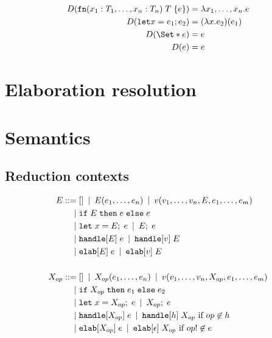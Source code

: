 \begin{align*}
    D(\fn(x_1: T_1, \dots, x_n: T_n)\;T\;\{e\}) &= \lambda x_1,\dots,x_n . e \\
    D(\kw{let} x = e_1; e_2) &= (\lambda x . e_2)(e_1)\\
    D(\S{e}) &= e\\
    D(e) &= e
\end{align*}

\section{Elaboration resolution}

\section{Semantics}
\subsection{Reduction contexts}

\begin{align*}
    E
        \IS & [] \OR E(e_1,\dots, e_n) \OR v(v_1,\dots,v_n,E,e_1,\dots,e_m) \\
        \OR & \cond{E}{e}{e} \\
        \OR & \kw{let}\;x = E;\;e \OR E;\;e\\
        \OR & \kw{handle}[E]\;e \OR \kw{handle}[v]\;E \\
        \OR & \kw{elab}[E]\;e \OR \kw{elab}[v]\;E\\
    \\
    X_{op}
        \IS & [] \OR X_{op}(e_1, \dots, e_n) \OR v(v_1, \dots, v_n, X_{op}, e_1, \dots, e_m) \\
        \OR & \cond{X_{op}}{e_1}{e_2} \\
        \OR & \kw{let}\;x = X_{op};\;e \OR X_{op};\;e \\
        \OR & \kw{handle}[X_{op}]\;e \OR \kw{handle}[h]\;{X_{op}} \text{ if } op\not\in h \\
        \OR & \elab[X_{op}]\;e \OR \kw{elab}[\epsilon]\;X_{op} \text{ if } op! \not\in e
\end{align*}

